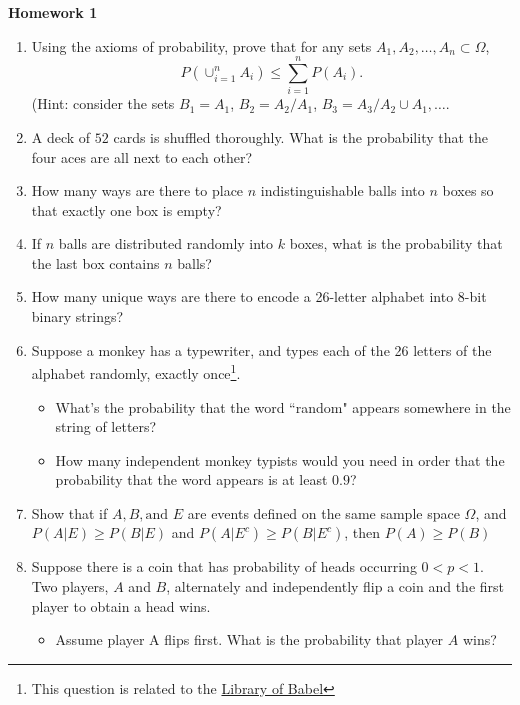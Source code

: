 \documentclass[10pt,twoside]{article}\usepackage[]{graphicx}\usepackage[dvipsnames,svgnames,table]{xcolor}
\begin{document}
\begin{flushright}
\begin{minipage}{.33\textwidth}
\rightline{\today}
\end{minipage}
\end{flushright}

\begin{center}
{\large{\textbf{Homework 1}}}
\end{center}

\begin{enumerate}
    \item Using the axioms of probability, prove that for any sets $A_1, A_2, \ldots, A_n \subset \Omega$,
    $$
    P\left(\cup_{i = 1}^n A_i\right) \leq \sum_{i = 1}^n P(A_i).
    $$
    (Hint: consider the sets $B_1 = A_1$, $B_2 = A_2 / A_1$, $B_3 = A_3 / A_2 \cup A_1, \ldots$.
    
    \item A deck of $52$ cards is shuffled thoroughly. What is the probability that the four aces are all next to each other? 

    \item How many ways are there to place $n$ indistinguishable balls into $n$ boxes so that exactly one box is empty? 
    
    \item If $n$ balls are distributed randomly into $k$ boxes, what is the probability that the last box contains $n$ balls?
    
    \item How many unique ways are there to encode a 26-letter alphabet into 8-bit binary strings?
    
    \item Suppose a monkey has a typewriter, and types each of the 26 letters of the alphabet randomly, exactly once\footnote{This question is related to the \href{https://libraryofbabel.info/About.html}{Library of Babel}}.
    \begin{itemize}
      \item What's the probability that the word ``random" appears somewhere in the string of letters? 
      \item How many independent monkey typists would you need in order that the probability that the word appears is at least $0.9$?
    \end{itemize}
    
    \item Show that if $A, B, \text{and } E$ are events defined on the same sample space $\Omega$, and $P(A|E) \geq P(B|E)$ and $P(A|E^c) \geq P(B|E^c)$, then $P(A) \geq P(B)$
    
    \item Suppose there is a coin that has probability of heads occurring $0 < p < 1$. 
    Two players, $A$ and $B$, alternately and independently flip a coin and the first player to obtain a head wins. 
    \begin{itemize}
      \item Assume player A flips first. What is the probability that player $A$ wins?
    \end{itemize}
    
\end{enumerate}
\end{document}
